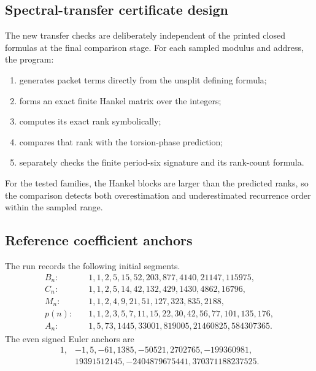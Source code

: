 \documentclass[11pt]{article}
\theoremstyle{definition}\newtheorem{definition}[theorem]{Definition}\newtheorem{example}[theorem]{Example}\newtheorem{construction}[theorem]{Construction}\newtheorem{algorithm}[theorem]{Algorithm}\newtheorem{conjecture}[theorem]{Conjecture}\newtheorem{problem}[theorem]{Problem}
\theoremstyle{remark}\newtheorem{remark}[theorem]{Remark}\newtheorem{boundary}[theorem]{Boundary}\newtheorem{certificate}[theorem]{Computational Certificate}\newtheorem{classical}[theorem]{Classical Input}\newtheorem{principle}[theorem]{Structural Principle}
\begin{document}
\subsection{Spectral-transfer certificate design}
The new transfer checks are deliberately independent of the printed closed formulas at the final comparison stage.  For each sampled modulus and address, the program:
\begin{enumerate}
\item generates packet terms directly from the unsplit defining formula;
\item forms an exact finite Hankel matrix over the integers;
\item computes its exact rank symbolically;
\item compares that rank with the torsion-phase prediction;
\item separately checks the finite period-six signature and its rank-count formula.
\end{enumerate}
For the tested families, the Hankel blocks are larger than the predicted ranks, so the comparison detects both overestimation and underestimated recurrence order within the sampled range.

\subsection{Reference coefficient anchors}
The run records the following initial segments.
\[
\begin{aligned}
B_n:&\quad1,1,2,5,15,52,203,877,4140,21147,115975,\\
C_n:&\quad1,1,2,5,14,42,132,429,1430,4862,16796,\\
M_n:&\quad1,1,2,4,9,21,51,127,323,835,2188,\\
p(n):&\quad1,1,2,3,5,7,11,15,22,30,42,56,77,101,135,176,\\
A_n:&\quad1,5,73,1445,33001,819005,21460825,584307365.
\end{aligned}
\]
The even signed Euler anchors are
\[
\begin{aligned}
1,&-1,5,-61,1385,-50521,2702765,-199360981,\\
&19391512145,-2404879675441,370371188237525.
\end{aligned}
\]
\end{document}
